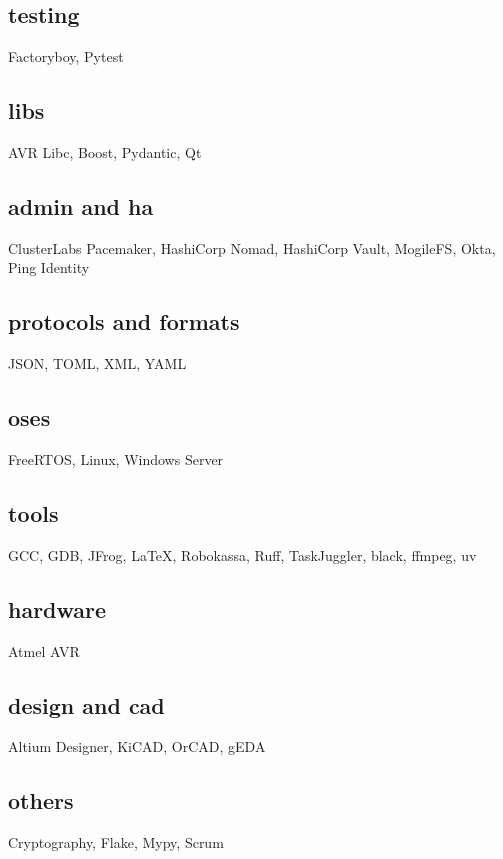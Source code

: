 \subsection{testing}
Factoryboy, Pytest%

\subsection{libs}
AVR Libc, Boost, Pydantic, Qt%

\subsection{admin and ha}
ClusterLabs Pacemaker, HashiCorp Nomad, HashiCorp Vault, MogileFS, Okta, Ping Identity%

\subsection{protocols and formats}
JSON, TOML, XML, YAML%

\subsection{oses}
FreeRTOS, Linux, Windows Server%

\subsection{tools}
GCC, GDB, JFrog, LaTeX, Robokassa, Ruff, TaskJuggler, black, ffmpeg, uv%

\subsection{hardware}
Atmel AVR%

\subsection{design and cad}
Altium Designer, KiCAD, OrCAD, gEDA%

\subsection{others}
Cryptography, Flake, Mypy, Scrum%